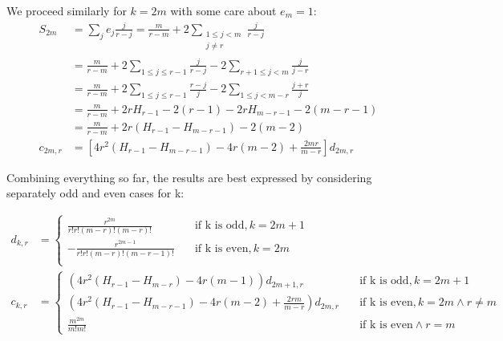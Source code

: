 \documentclass{article}
\begin{document}
We proceed similarly for $k=2m$ with some care about $e_{m}=1$:
$$
\begin{aligned}
    S_{2m} &= \sum_{j}e_j \frac{j}{r-j} = \frac{m}{r-m} + 2\sum_{\substack{1 \leq j < m \\ j \neq r}}\frac{j}{r-j}\\ 
    &= \frac{m}{r-m} + 2 \sum_{1 \leq j \leq r-1} \frac{j}{r-j} - 2\sum_{r+1 \leq j < m}\frac{j}{j-r} \\
    &= \frac{m}{r-m} + 2\sum_{1 \leq j \leq r-1}\frac{r-j}{j} -2\sum_{1 \leq j < m-r}\frac{j+r}{j} \\
    &= \frac{m}{r-m} + 2rH_{r-1}-2(r-1)-2rH_{m-r-1}-2(m-r-1) \\
    &= \frac{m}{r-m} + 2r(H_{r-1}-H_{m-r-1})-2(m-2) \\
    c_{2m,r} &= \left [4r^2(H_{r-1}-H_{m-r-1})-4r(m-2) + \frac{2mr}{m-r}\right ]d_{2m,r}
\end{aligned}
$$

Combining everything so far, the results are best expressed by considering separately odd and even cases for k:

$$
\begin{aligned}
    d_{k,r} &= \begin{cases}
        \frac{r^{2m}}{r!r!(m-r)!(m-r)!} & \quad \text{if k is odd,} \, k=2m+1 \\
        -\frac{r^{2m-1}}{r!r!(m-r)!(m-r-1)!}&\quad \text{if k is even,} \, k=2m \\
    \end{cases} \\
    c_{k,r} &= \begin{cases}
        (4r^2(H_{r-1}-H_{m-r})-4r(m-1))d_{2m+1,r} & \quad \text{if k is odd,} \, k=2m+1 \\
        (4r^2(H_{r-1}-H_{m-r-1})-4r(m-2) + \frac{2rm}{m-r})d_{2m,r} &\quad \text{if k is even,} \, k=2m \land r\neq m\\
        \frac{m^{2m}}{m!m!} & \quad \text{if k is even} \land r=m 
    \end{cases}
\end{aligned}
$$
\end{document}
